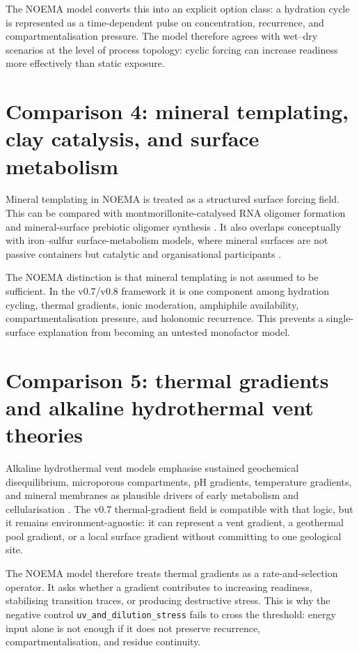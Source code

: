 \documentclass[11pt]{article}
\begin{document}
The NOEMA model converts this into an explicit option class: a hydration cycle is represented as a time-dependent pulse on concentration, recurrence, and compartmentalisation pressure. The model therefore agrees with wet--dry scenarios at the level of process topology: cyclic forcing can increase readiness more effectively than static exposure.

\section{Comparison 4: mineral templating, clay catalysis, and surface metabolism}
Mineral templating in NOEMA is treated as a structured surface forcing field. This can be compared with montmorillonite-catalysed RNA oligomer formation and mineral-surface prebiotic oligomer synthesis \cite{FerrisErtem1993Montmorillonite,Ferris1996MineralSurfaces}. It also overlaps conceptually with iron--sulfur surface-metabolism models, where mineral surfaces are not passive containers but catalytic and organisational participants \cite{Wachtershauser1988}.

The NOEMA distinction is that mineral templating is not assumed to be sufficient. In the v0.7/v0.8 framework it is one component among hydration cycling, thermal gradients, ionic moderation, amphiphile availability, compartmentalisation pressure, and holonomic recurrence. This prevents a single-surface explanation from becoming an untested monofactor model.

\section{Comparison 5: thermal gradients and alkaline hydrothermal vent theories}
Alkaline hydrothermal vent models emphasise sustained geochemical disequilibrium, microporous compartments, pH gradients, temperature gradients, and mineral membranes as plausible drivers of early metabolism and cellularisation \cite{MartinRussell2003,MartinBarossKelleyRussell2008}. The v0.7 thermal-gradient field is compatible with that logic, but it remains environment-agnostic: it can represent a vent gradient, a geothermal pool gradient, or a local surface gradient without committing to one geological site.

The NOEMA model therefore treats thermal gradients as a rate-and-selection operator. It asks whether a gradient contributes to increasing readiness, stabilising transition traces, or producing destructive stress. This is why the negative control \texttt{uv\_and\_dilution\_stress} fails to cross the threshold: energy input alone is not enough if it does not preserve recurrence, compartmentalisation, and residue continuity.
\end{document}
